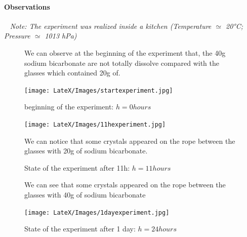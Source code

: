 \documentclass[draft, final]{report}
\begin{document}
\paragraph{Observations}
~\newline
\emph{Note: The experiment was realized inside a kitchen (Temperature $\simeq$ 20°C; Pressure $\simeq$ 1013 hPa)}

\begin{figure}[!ht]
  \begin{minipage}[c]{0.50\linewidth}
    We can observe at the beginning of the experiment that, the 40g sodium bicarbonate are not totally dissolve compared  with the glasses which contained 20g of.
  \end{minipage}\hfill
  \begin{minipage}[c]{0.50\linewidth}
  \begin{center}
    \texttt{[image: LateX/Images/startexperiment.jpg]}
    \caption{beginning of the experiment: $h=0 hours$}
  \end{center}
\end{minipage}
\end{figure}

\begin{figure}[!ht]
  \begin{minipage}[c]{0.50\linewidth}
    \begin{center}
      \texttt{[image: LateX/Images/11hexperiment.jpg]}
      \caption{State of the experiment after 11h: $h=11 hours$}
    \end{center}
  \end{minipage}\hfill
  \begin{minipage}[c]{0.50\linewidth}
    We can notice that some crystals  appeared on the rope between the glasses with 20g of sodium bicarbonate.
  \end{minipage}
\end{figure}

\begin{figure}[!ht]
  \begin{minipage}[c]{0.50\linewidth}
    We can see that some crystals  appeared on the rope between the glasses with 40g of sodium bicarbonate
  \end{minipage}\hfill
  \begin{minipage}[c]{0.50\linewidth}
  \begin{center}
    \texttt{[image: LateX/Images/1dayexperiment.jpg]}
    \caption{State of the experiment after 1 day: $h=24 hours$}
  \end{center}
\end{minipage}
\end{figure}
\end{document}
